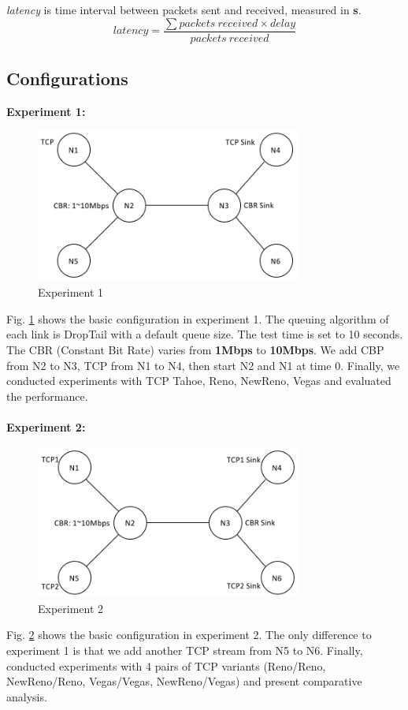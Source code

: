 \documentclass[10pt, conference]{IEEEtran}
\begin{document}
	\textit{latency} is time interval between packets sent and received, measured in \textbf{s}.
	$$ latency = \frac{\sum packets \ received \times delay}{packets \ received}$$
	
	\subsection{Configurations}
	\textbf{Experiment 1:}
	\begin{figure}[H]
		\centering
		\includegraphics[width=3.45in]{imgs/pic2.png}
		\caption[Optional caption]{Experiment 1}
		\label{fig:2}
	\end{figure}
	Fig. \ref{fig:2} shows the basic configuration in experiment 1. The queuing algorithm of each link is DropTail with a default queue size. The test time is set to 10 seconds. The CBR (Constant Bit Rate) varies from \textbf{1Mbps} to \textbf{10Mbps}. We add CBP from N2 to N3, TCP from N1 to N4, then start N2 and N1 at time 0. Finally, we conducted experiments with TCP Tahoe, Reno, NewReno, Vegas and evaluated the performance.
	\\\\
	\textbf{Experiment 2:}
	\begin{figure}[H]
		\centering
		\includegraphics[width=3.45in]{imgs/pic3.png}
		\caption[Optional caption]{Experiment 2}
		\label{fig:3}
	\end{figure}
	Fig. \ref{fig:3} shows the basic configuration in experiment 2. The only difference to experiment 1 is that we add another TCP stream from N5 to N6. Finally, conducted experiments with 4 pairs of TCP variants (Reno/Reno, NewReno/Reno, Vegas/Vegas, NewReno/Vegas) and present comparative analysis.
\end{document}

